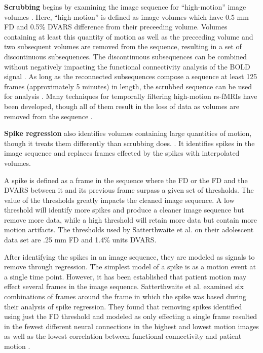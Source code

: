 \textbf{Scrubbing} begins by examining the image sequence for ``high-motion'' image volumes \cite{Power2012}. Here, ``high-motion'' is defined as image volumes which have 0.5 mm FD and 0.5\% DVARS difference from their preceeding volume. Volumes containing at least this quantity of motion as well as the preceeding volume and two subsequent volumes are removed from the sequence, resulting in a set of discontinuous subsequences. The discontinuous subsequences can be combined without negatively impacting the functional connectivity analysis of the BOLD signal \cite{Fair2007} \cite{VanDijk2010}. As long as the reconnected subsequences compose a sequence at least 125 frames (approximately 5 minutes) in length, the scrubbed sequence can be used for analysis \cite{Power2012}. Many techniques for temporally filtering high-motion rs-fMRIs have been developed,  though all of them result in the loss of data as volumes are removed from the sequence \cite{Barnes2011} \cite{Fransson2007} \cite{Jones2010} \cite{Kennedy2008} \cite{Smyser2010} \cite{Smyser2011}.  

\textbf{Spike regression} also identifies volumes containing large quantities of motion, though it treats them differently than scrubbing does. \cite{Satterthwaite2013}. It identifies spikes in the image sequence and replaces frames effected by the spikes with interpolated volumes.

A spike is defined as a frame in the sequence where the FD or the FD and the DVARS between it and its previous frame surpass a given set of thresholds. The value of the thresholds greatly impacts the cleaned image sequence. A low threshold will identify more spikes and produce a cleaner image sequence but remove more data, while a high threshold will retain more data but contain more motion artifacts. The thresholds used by Satterthwaite et al. on their adolescent data set are .25 mm FD and 1.4\% units DVARS. 

After identifying the spikes in an image sequence, they are modeled as signals to remove through regression. The simplest model of a spike is as a motion event at a single time point. However, it has been established that patient motion may effect several frames in the image sequence. Satterthwaite et al. examined six combinations of frames around the frame in which the spike was based during their analysis of spike regression. They found that removing spikes identified using just the FD threshold and modeled as only effecting a single frame resulted in the fewest different neural connections in the highest and lowest motion images as well as the lowest correlation between functional connectivity and patient motion \cite{Satterthwaite2013}.

